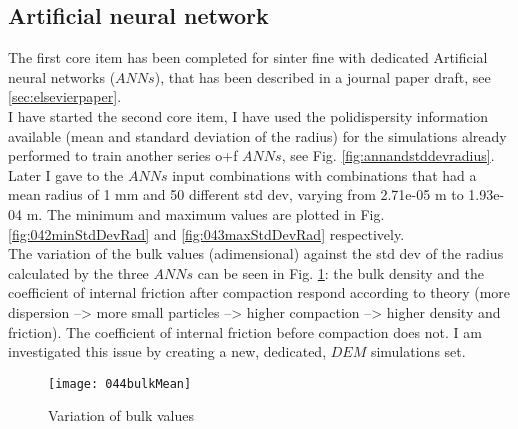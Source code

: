 \subsection{Artificial neural network}
\label{subsection:artificialneuralnetwork}

The first core item has been completed for sinter fine with dedicated Artificial
neural networks ($ANNs$), that has been described in a journal paper draft, see
\ref{sec:elsevierpaper}.\\

I have started the second core item, I have used the polidispersity information
available (mean and standard deviation of the radius) for the simulations
already performed to train another series o+f $ANNs$, see Fig.
\ref{fig:annandstddevradius}.\\
Later I gave to the $ANNs$ input combinations with combinations that had a mean radius of 1 mm
and 50 different std dev, varying from 2.71e-05 m to 1.93e-04 m.
The minimum and maximum values are plotted in Fig. \ref{fig:042minStdDevRad} and
\ref{fig:043maxStdDevRad} respectively.\\
The variation of the bulk values (adimensional) against the std dev of the
radius calculated by the three $ANNs$ can be seen in Fig. \ref{fig:044bulkMean}:
the bulk density and the coefficient of internal friction after
compaction respond according to theory (more dispersion --> more small particles
--> higher compaction --> higher density and friction).
The coefficient of internal friction before compaction does not.
I am investigated this issue by creating a new, dedicated, $DEM$ simulations
set.


\begin{figure}[!h]
\centering
\texttt{[image: 044bulkMean]}
\caption{Variation of bulk values }
\label{fig:044bulkMean}
\end{figure}

\newpage
